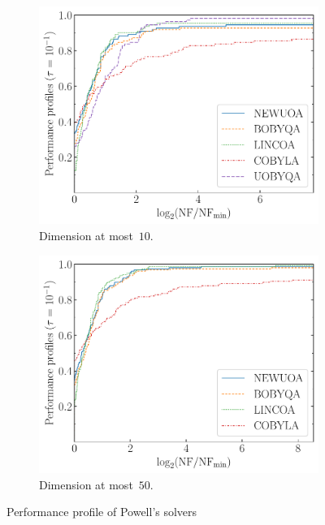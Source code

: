 \documentclass[
    smallextended,  %
    final,        %
]{svjour3}
\begin{document}
\begin{figure}[ht]
    \begin{subfigure}{.48\textwidth}
        \centering
        \includegraphics[width=\textwidth]{perf-plain-pdfo-10.pdf}
        \caption{Dimension at most~$10$.}
        \label{fig:ppu-10}
    \end{subfigure}
    \hfill
    \begin{subfigure}{.48\textwidth}
        \centering
        \includegraphics[width=\textwidth]{perf-plain-pdfo-50.pdf}
        \caption{Dimension at most~$50$.}
        \label{fig:ppu-50}
    \end{subfigure}
    \caption{Performance profile of Powell's  solvers}
\end{figure}
\end{document}
